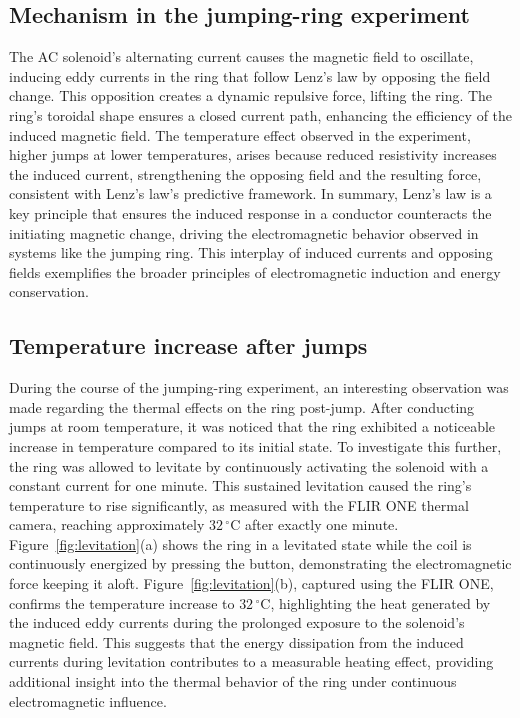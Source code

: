 \documentclass[11pt]{article}
\newcommand{\tC}[1]{$#1\,^{\circ}\mathrm{C}$}
\begin{document}
\subsection*{Mechanism in the jumping-ring experiment}

The AC solenoid's alternating current causes the magnetic field to oscillate, inducing eddy
currents in the ring that follow Lenz's law by opposing the field change. This opposition creates a
dynamic repulsive force, lifting the ring. The ring's toroidal shape ensures a closed current path,
enhancing the efficiency of the induced magnetic field. The temperature effect observed in the
experiment, higher jumps at lower temperatures, arises because reduced resistivity increases the
induced current, strengthening the opposing field and the resulting force, consistent with Lenz's
law's predictive framework. In summary, Lenz's law is a key principle that ensures the induced
response in a conductor counteracts the initiating magnetic change, driving the electromagnetic
behavior observed in systems like the jumping ring. This interplay of induced currents and opposing
fields exemplifies the broader principles of electromagnetic induction and energy conservation.

\subsection*{Temperature increase after jumps}

During the course of the jumping-ring experiment, an interesting observation was made regarding the
thermal effects on the ring post-jump. After conducting jumps at room temperature, it was noticed
that the ring exhibited a noticeable increase in temperature compared to its initial state. To
investigate this further, the ring was allowed to levitate by continuously activating the solenoid
with a constant current for one minute. This sustained levitation caused the ring's temperature to rise significantly, as
measured with the FLIR ONE thermal camera, reaching approximately \tC{32} after exactly one minute.
Figure~\ref{fig:levitation}(a) shows the ring in a levitated state while the coil is continuously
energized by pressing the button, demonstrating the electromagnetic force keeping it aloft.
Figure~\ref{fig:levitation}(b), captured using the FLIR ONE, confirms the temperature increase to
\tC{32}, highlighting the heat generated by the induced eddy currents during the prolonged exposure
to the solenoid's magnetic field. This suggests that the energy dissipation from the induced
currents during levitation contributes to a measurable heating effect, providing additional insight
into the thermal behavior of the ring under continuous electromagnetic influence.
\end{document}
